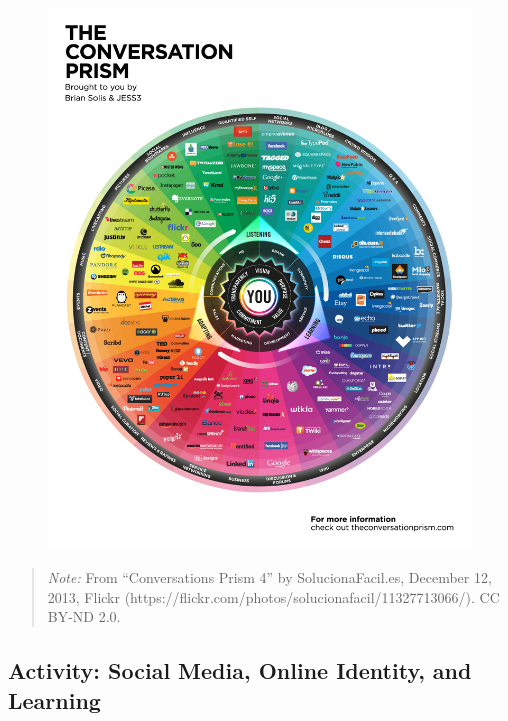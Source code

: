 \documentclass[
  letterpaper,
  DIV=11,
  numbers=noendperiod]{scrreprt}
\begin{document}
\begin{tcolorbox}
\begin{figure}[H]
\includegraphics{assets/u5/conversation_prism.jpg}

\end{figure}%

\begin{quote}
\emph{Note:} From ``Conversations Prism 4'' by SolucionaFacil.es,
December 12, 2013, Flickr
(https://flickr.com/photos/solucionafacil/11327713066/). CC BY-ND 2.0.
\end{quote}

\end{tcolorbox}

\subsection{Activity: Social Media, Online Identity, and
Learning}\label{activity-social-media-online-identity-and-learning}
\end{document}
